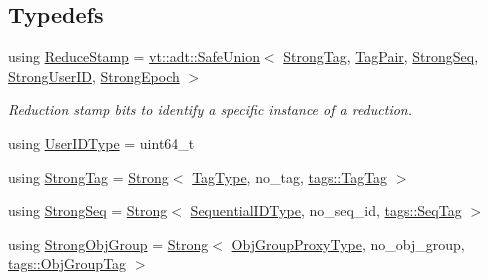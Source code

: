 \subsection*{Typedefs}
\begin{DoxyCompactItemize}
\item 
using \hyperlink{namespacevt_1_1collective_1_1reduce_1_1detail_aacc1fcd729d934ba143fee3a943bf9e7}{Reduce\+Stamp} = \hyperlink{namespacevt_1_1adt_ad2a7bbcb5f4735ae9d847f96ee62f144}{vt\+::adt\+::\+Safe\+Union}$<$ \hyperlink{namespacevt_1_1collective_1_1reduce_1_1detail_a5e1b708dc12ad0d1209a354ed21ed744}{Strong\+Tag}, \hyperlink{structvt_1_1collective_1_1reduce_1_1detail_1_1_tag_pair}{Tag\+Pair}, \hyperlink{namespacevt_1_1collective_1_1reduce_1_1detail_affec2854d7d65bafb17eb259714e9443}{Strong\+Seq}, \hyperlink{namespacevt_1_1collective_1_1reduce_1_1detail_af9e42b20d1be7dccc1b5e587f0387e02}{Strong\+User\+ID}, \hyperlink{namespacevt_1_1collective_1_1reduce_1_1detail_ad6739d14b8ee41189f785355708748fc}{Strong\+Epoch} $>$
\begin{DoxyCompactList}\small\item\em Reduction stamp bits to identify a specific instance of a reduction. \end{DoxyCompactList}\item 
using \hyperlink{namespacevt_1_1collective_1_1reduce_1_1detail_ae82d7b96b0885b9b7dfb0104398beead}{User\+I\+D\+Type} = uint64\+\_\+t
\item 
using \hyperlink{namespacevt_1_1collective_1_1reduce_1_1detail_a5e1b708dc12ad0d1209a354ed21ed744}{Strong\+Tag} = \hyperlink{namespacevt_adbd3338278905742eb2de6db590fd2f1}{Strong}$<$ \hyperlink{namespacevt_a84ab281dae04a52a4b243d6bf62d0e52}{Tag\+Type}, no\+\_\+tag, \hyperlink{structvt_1_1collective_1_1reduce_1_1detail_1_1tags_1_1_tag_tag}{tags\+::\+Tag\+Tag} $>$
\item 
using \hyperlink{namespacevt_1_1collective_1_1reduce_1_1detail_affec2854d7d65bafb17eb259714e9443}{Strong\+Seq} = \hyperlink{namespacevt_adbd3338278905742eb2de6db590fd2f1}{Strong}$<$ \hyperlink{namespacevt_a3063d4db3b879d6dd2c7b8d50995c7f6}{Sequential\+I\+D\+Type}, no\+\_\+seq\+\_\+id, \hyperlink{structvt_1_1collective_1_1reduce_1_1detail_1_1tags_1_1_seq_tag}{tags\+::\+Seq\+Tag} $>$
\item 
using \hyperlink{namespacevt_1_1collective_1_1reduce_1_1detail_afd4940b3a4ac2ef740f0e3844a09dd08}{Strong\+Obj\+Group} = \hyperlink{namespacevt_adbd3338278905742eb2de6db590fd2f1}{Strong}$<$ \hyperlink{namespacevt_ad7cae989df485fccca57f0792a880a8e}{Obj\+Group\+Proxy\+Type}, no\+\_\+obj\+\_\+group, \hyperlink{structvt_1_1collective_1_1reduce_1_1detail_1_1tags_1_1_obj_group_tag}{tags\+::\+Obj\+Group\+Tag} $>$

\end{DoxyCompactItemize}
